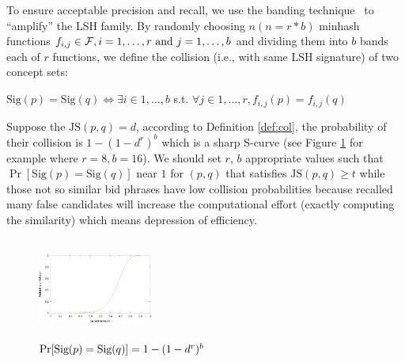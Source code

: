 To ensure acceptable precision and recall, we use the banding
technique~\cite{raja:massivedatasets} to ``amplify'' the LSH family. By
randomly choosing $n(n=r\ast b)$ minhash functions
$f_{i,j}\in\mathcal{F},i=1,\ldots,r\textnormal{ and }j=1,\ldots,b$ and
dividing them into $b$ bands each of $r$ functions, we define the
collision (i.e., with same LSH signature) of two concept sets:
\begin{definition}
\label{def:col}
$\text{Sig}(p)=\text{Sig}(q)\Leftrightarrow{}\exists i\in 1,\ldots,b$ s.t. $\forall
j\in 1,\ldots,r,f_{i,j}(p)=f_{i,j}(q)$
\end{definition}
Suppose the $\text{JS}(p,q)=d$, according to Definition \ref{def:col}, the probability of their
collision is $1-(1-d^r)^b$ which is a sharp S-curve (see Figure
        \ref{fig:scurve} for example where $r=8, b=16$).  
We should set $r$, $b$ appropriate values such that %
$\Pr[\text{Sig}(p)=\text{Sig}(q)]$ near $1$ for $(p,q)$ that satisfies
$\text{JS}(p,q)\geq t$ while those not so similar bid phrases have low
collision probabilities because recalled many false candidates will increase the
computational effort (exactly computing the similarity) which means
depression of efficiency.
\begin{figure}
\centering
\includegraphics[width=1.5in, height=1.3in]{figures/scurve.eps}
\caption{$\Pr[\textnormal{Sig}(p)=\textnormal{Sig}(q)]=1-(1-d^r)^b$}
\label{fig:scurve}
\end{figure}



